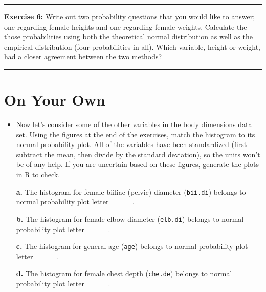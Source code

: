 \documentclass[]{book}
\theoremstyle{definition}
\theoremstyle{definition}
\theoremstyle{definition}
\theoremstyle{remark}
\begin{document}
\begin{center}\rule{0.5\linewidth}{\linethickness}\end{center}

\textbf{Exercise 6:} Write out two probability questions that you would
like to answer; one regarding female heights and one regarding female
weights. Calculate the those probabilities using both the theoretical
normal distribution as well as the empirical distribution (four
probabilities in all). Which variable, height or weight, had a closer
agreement between the two methods?

\begin{center}\rule{0.5\linewidth}{\linethickness}\end{center}

\section{On Your Own}\label{on-your-own-2}

\begin{itemize}
\item
  Now let's consider some of the other variables in the body dimensions
  data set. Using the figures at the end of the exercises, match the
  histogram to its normal probability plot. All of the variables have
  been standardized (first subtract the mean, then divide by the
  standard deviation), so the units won't be of any help. If you are
  uncertain based on these figures, generate the plots in R to check.

  \textbf{a.} The histogram for female biiliac (pelvic) diameter
  (\texttt{bii.di}) belongs to normal probability plot letter \_\_\_\_.

  \textbf{b.} The histogram for female elbow diameter (\texttt{elb.di})
  belongs to normal probability plot letter \_\_\_\_.

  \textbf{c.} The histogram for general age (\texttt{age}) belongs to
  normal probability plot letter \_\_\_\_.

  \textbf{d.} The histogram for female chest depth (\texttt{che.de})
  belongs to normal probability plot letter \_\_\_\_.
\end{itemize}
\end{document}

